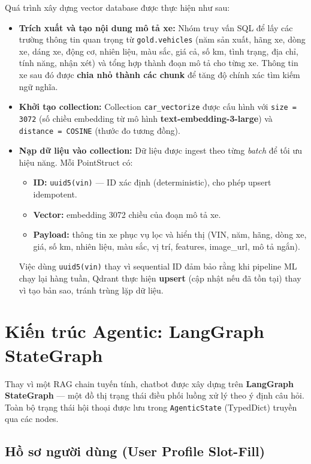 \noindent Quá trình xây dựng vector database được thực hiện như sau:
\begin{itemize}
    \item \textbf{Trích xuất và tạo nội dung mô tả xe:} Nhóm truy vấn SQL để lấy các trường thông tin quan trọng từ \texttt{gold.vehicles} (năm sản xuất, hãng xe, dòng xe, dáng xe, động cơ, nhiên liệu, màu sắc, giá cả, số km, tình trạng, địa chỉ, tính năng, nhận xét) và tổng hợp thành đoạn mô tả cho từng xe. Thông tin xe sau đó được \textbf{chia nhỏ thành các chunk} để tăng độ chính xác tìm kiếm ngữ nghĩa.

    \item \textbf{Khởi tạo collection:} Collection \texttt{car\_vectorize} được cấu hình với \texttt{size = 3072} (số chiều embedding từ mô hình \textbf{text-embedding-3-large}) và \texttt{distance = COSINE} (thước đo tương đồng).

    \item \textbf{Nạp dữ liệu vào collection:} Dữ liệu được ingest theo từng \textit{batch} để tối ưu hiệu năng. Mỗi PointStruct có:
    \begin{itemize}
        \item \textbf{ID:} \texttt{uuid5(vin)} — ID xác định (deterministic), cho phép upsert idempotent.
        \item \textbf{Vector:} embedding 3072 chiều của đoạn mô tả xe.
        \item \textbf{Payload:} thông tin xe phục vụ lọc và hiển thị (VIN, năm, hãng, dòng xe, giá, số km, nhiên liệu, màu sắc, vị trí, features, image\_url, mô tả ngắn).
    \end{itemize}
    Việc dùng \texttt{uuid5(vin)} thay vì sequential ID đảm bảo rằng khi pipeline ML chạy lại hàng tuần, Qdrant thực hiện \textbf{upsert} (cập nhật nếu đã tồn tại) thay vì tạo bản sao, tránh trùng lặp dữ liệu.
\end{itemize}

\section{Kiến trúc Agentic: LangGraph StateGraph}

Thay vì một RAG chain tuyến tính, chatbot được xây dựng trên \textbf{LangGraph StateGraph} — một đồ thị trạng thái điều phối luồng xử lý theo ý định câu hỏi. Toàn bộ trạng thái hội thoại được lưu trong \texttt{AgenticState} (TypedDict) truyền qua các nodes.

\subsection{Hồ sơ người dùng (User Profile Slot-Fill)}

